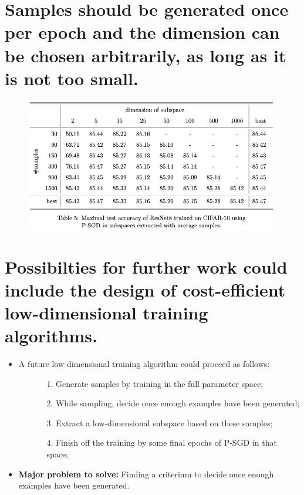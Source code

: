 \documentclass[t]{beamer}
\begin{document}
\section{Samples should be generated once per epoch and the dimension can be chosen arbitrarily, as long as it is not too small.}
\begin{frame}
\begin{figure}
\includegraphics[width=0.99\textwidth]{exp-5}
\end{figure}
\end{frame}

\section{Possibilties for further work could include the design of cost-efficient low-dimensional training algorithms.}
\begin{frame}
\begin{itemize}
\item A future low-dimensional training algorithm could proceed as follows:  \vspace{0.5cm}
\begin{itemize}
\item []
\begin{itemize}
\item [1.] Generate samples by training in the full parameter space; \vspace{0.2cm}
\item [2.] While sampling, decide once enough examples have been generated; \vspace{0.2cm}
\item [3.] Extract a low-dimensional subspace based on these samples; \vspace{0.2cm}
\item [4.] Finish off the training by some final epochs of P-SGD in that space; \vspace{0.5cm}
\end{itemize}
\end{itemize}
\item \textbf{Major problem to solve:} Finding a criterium to decide once enough examples have been generated.
\end{itemize}
\end{frame}
\end{document}
